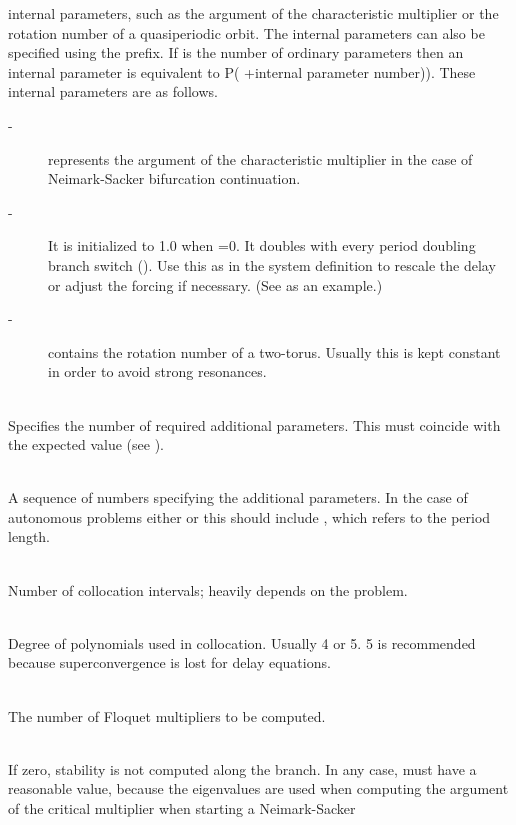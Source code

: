 \documentclass[10pt,a4paper]{ddedoc}
\begin{document}
\begin{description}
internal parameters, such as the argument of the characteristic multiplier or
the rotation number of a quasiperiodic orbit.
The internal parameters can also be specified using the  prefix. If  is the number of
ordinary parameters then an internal parameter is equivalent to P( +internal parameter number)). 
These  internal parameters are as follows.
\begin{description}
\item[ -] represents the argument of the characteristic multiplier in the case of
Neimark-Sacker bifurcation continuation.
\item[ -] It is initialized to 1.0 when =0. It doubles with
every period doubling branch switch (). Use this as  in the
system definition to rescale the delay or adjust the forcing if necessary. (See  as an example.)
\item[ -] contains the rotation number of a two-torus. Usually this is kept
constant in order to avoid strong resonances.
\end{description}
%
\item[\funp{NPARX}] ~\\
Specifies the number of required additional parameters. This must coincide with
the expected value (see ).
%
\item[\funp{PARX}] ~\\
A sequence of numbers specifying the additional parameters. In
the case of autonomous problems either  or this should include
, which refers to the period length.
%
\item[\funp{NINT}] ~\\
Number of collocation intervals; heavily depends on the problem.
%
\item[\funp{NDEG}] ~\\
Degree of polynomials used in collocation. Usually 4 or 5. 
5 is recommended because superconvergence is lost for delay equations.
%
\item[\funp{NMUL}] ~\\
The number of Floquet multipliers to be computed.
%
\item[\funp{STAB}] ~\\
If zero, stability is not computed along the branch. In any case, 
must have a reasonable value, because the eigenvalues are used when computing
the argument of the critical multiplier when starting a Neimark-Sacker

\end{description}
\end{document}

